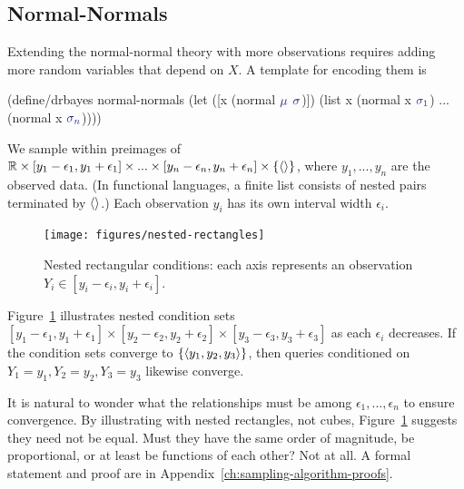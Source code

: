 \subsection{Normal-Normals}

Extending the normal-normal theory with more observations requires adding more random variables that depend on $\mathit{X}$.
A template for encoding them is
\begin{center}\singlespacing
\begin{schemedisplay}
(define/drbayes normal-normals
  (let ([x  (normal $\va{\mu}$ $\va{\sigma}$)])
    (list x (normal x $\va{\sigma_1}$) ... (normal x $\va{\sigma_n}$))))
\end{schemedisplay}
\end{center}
We sample within preimages of $\mathbb{R} \times [y_1-\epsilon_1,y_1+\epsilon_1] \times ... \times [y_n-\epsilon_n,y_n+\epsilon_n] \times \{{\langle{}\rangle}\}$, where $y_1,...,y_n$ are the observed data.
(In functional languages, a finite list consists of nested pairs terminated by $\langle{}\rangle$.)
Each observation $y_i$ has its own interval width $\epsilon_i$.

\begin{figure}[tb!]\centering
\texttt{[image: figures/nested-rectangles]}
\caption[Nested rectangular conditions]{Nested rectangular conditions: each axis represents an observation {$\mathit{Y_i} \in [y_i-\epsilon_i,y_i+\epsilon_i]$}.}
\label{fig:nested-rectangles}
\end{figure}

Figure~\ref{fig:nested-rectangles} illustrates nested condition sets $[y_1-\epsilon_1,y_1+\epsilon_1] \times [y_2-\epsilon_2,y_2+\epsilon_2] \times [y_3-\epsilon_3,y_3+\epsilon_3]$ as each $\epsilon_i$ decreases.
If the condition sets converge to $\{{\langle{y_1,y_2,y_3}\rangle}\}$, then queries conditioned on $\mathit{Y_1} = y_1,\mathit{Y_2} = y_2,\mathit{Y_3} = y_3$ likewise converge.

It is natural to wonder what the relationships must be among $\epsilon_1,...,\epsilon_n$ to ensure convergence.
By illustrating with nested rectangles, not cubes, Figure~\ref{fig:nested-rectangles} suggests they need not be equal.
Must they have the same order of magnitude, be proportional, or at least be functions of each other?
Not at all.
A formal statement and proof are in Appendix~\ref{ch:sampling-algorithm-proofs}.

